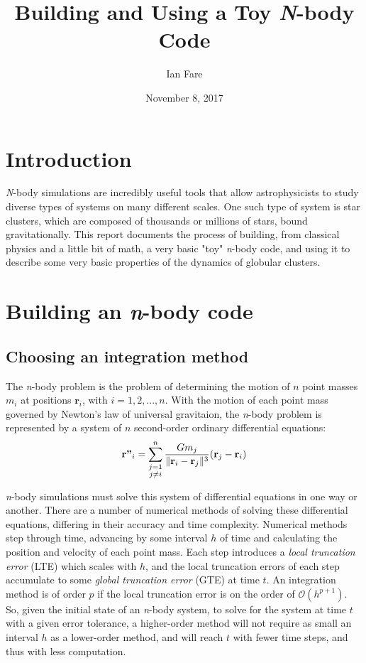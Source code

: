 \documentclass{article}
\title{Building and Using a Toy \textit{N}-body Code}
\author{Ian Fare}
\date{November 8, 2017}
\DeclarePairedDelimiter{\norm}{\lVert}{\rVert}
\begin{document}
\maketitle

\section{Introduction}

\textit{N}-body simulations are incredibly useful tools that allow astrophysicists to study diverse types of systems on many different scales. One such type of system is star clusters, which are composed of thousands or millions of stars, bound gravitationally. This report documents the process of building, from classical physics and a little bit of math, a very basic "toy" \textit{n}-body code, and using it to describe some very basic properties of the dynamics of globular clusters.

\section{Building an \textit{n}-body code}

\subsection{Choosing an integration method}

The \textit{n}-body problem is the problem of determining the motion of $n$ point masses $m_i$ at positions $\textbf{r}_i$, with $i=1,2,...,n$. With the motion of each point mass governed by Newton's law of universal gravitaion, the \textit{n}-body problem is represented by a system of $n$ second-order ordinary differential equations:
\begin{equation}
    \textbf{r''}_i = \sum_{\substack{j=1\\j\neq i}}^n \frac{Gm_j}{\norm{\textbf{r}_i-\textbf{r}_j}^3}(\textbf{r}_j-\textbf{r}_i)
\end{equation}

\textit{n}-body simulations must solve this system of differential equations in one way or another. There are a number of numerical methods of solving these differential equations, differing in their accuracy and time complexity. Numerical methods step through time, advancing by some interval $h$ of time and calculating the position and velocity of each point mass. Each step introduces a \textit{local truncation error} (LTE) which scales with $h$, and the local truncation errors of each step accumulate to some \textit{global truncation error} (GTE) at time $t$. An integration method is of order $p$ if the local truncation error is on the order of $\mathcal{O}(h^{p+1})$. So, given the initial state of an \textit{n}-body system, to solve for the system at time $t$ with a given error tolerance, a higher-order method will not require as small an interval $h$ as a lower-order method, and will reach $t$ with fewer time steps, and thus with less computation. 
\end{document}
